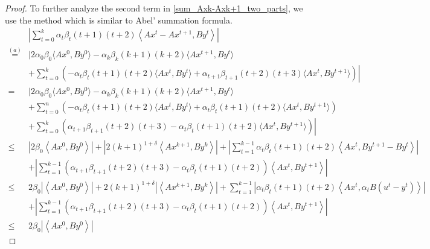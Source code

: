 \documentclass{article}
\numberwithin{equation}{section}
\begin{document}
\begin{proof}
    To further analyze the second term in \eqref{sum_Axk-Axk+1_two_parts}, we use the method which is 
    similar to Abel' summation formula. 
    \begin{align}
        &\left| \sum\limits_{t = 0}^k\alpha_t\beta_{t}(t+1)(t+2)\left\langle Ax^t- Ax^{t+1},By^t \right\rangle \right| \nonumber \\
        \overset{(a)}{=}& \Bigg| 2\alpha_0\beta_0 \langle Ax^0, By^0 \rangle -\alpha_k\beta_k(k+1)(k+2)\langle Ax^{t+1}, By^t \rangle  \nonumber \\
        &+\left.\sum\limits_{t=0}^k\left(-\alpha_t\beta_t(t+1)(t+2)\langle Ax^t, By^t \rangle+\alpha_{t+1}\beta_{t+1}(t+2)(t+3)
        \langle Ax^{t}, By^{t+1} \rangle\right) \right| \nonumber \\
        =& \Bigg| 2\alpha_0\beta_0 \langle Ax^0, By^0 \rangle -\alpha_k\beta_k(k+1)(k+2)\langle Ax^{t+1}, By^t \rangle  \nonumber \\
        &+\sum\limits_{t=0}^n\left(-\alpha_t\beta_t(t+1)(t+2)\langle Ax^t, By^t \rangle+\alpha_t\beta_{t}(t+1)(t+2) 
        \langle Ax^{t}, By^{t+1} \rangle\right)  \nonumber \\
        & \left.+ \sum\limits_{t=0}^k\left(\alpha_{t+1}\beta_{t+1}(t+2)(t+3) - \alpha_t\beta_t(t+1)(t+2)\langle Ax^t, By^{t+1} \rangle\right) \right| \nonumber \\
       \leq & \left| 2\beta_0 \left\langle Ax^0, By^0 \right\rangle \right|
        + \left|2(k+1)^{1+\delta}\left\langle  Ax^{k+1},By^k \right\rangle\right| +\left| \sum\limits_{t=1}^{k-1}\alpha_t \beta_{t}(t+1)(t+2) \left\langle Ax^t, By^{t+1}-By^t \right\rangle \right| \nonumber \\
        & + \left|\sum\limits_{t=1}^{k-1}\left(\alpha_{t+1}\beta_{t+1}(t+2)(t+3) - \alpha_t\beta_{t}(t+1)(t+2)\right)\left\langle Ax^t, By^{t+1} \right\rangle \right| \nonumber \\
        \overset{\mathop{(b)}}{\leq} & 2 \beta_0 \left| \left\langle Ax^0, By^0 \right\rangle \right|
        + 2(k+1)^{1+\delta} \left| \left\langle  Ax^{k+1},By^k \right\rangle\right| 
        + \sum\limits_{t=1}^{k-1} \left| \alpha_t \beta_{t} (t+1)(t+2) \left\langle Ax^t, \alpha_tB(u^t-y^t) \right\rangle \right| \nonumber \\
        & +\left|\sum\limits_{t=1}^{k-1}\left(\alpha_{t+1}\beta_{t+1}(t+2)(t+3) - \alpha_t\beta_{t}(t+1)(t+2)\right)\left\langle Ax^t, By^{t+1} \right\rangle \right|
        \nonumber \\
        \overset{\mathop{(c)}}{\leq} & 2 \beta_0 \left| \left\langle Ax^0, By^0 \right\rangle \right|

\end{align}
\end{proof}
\end{document}
